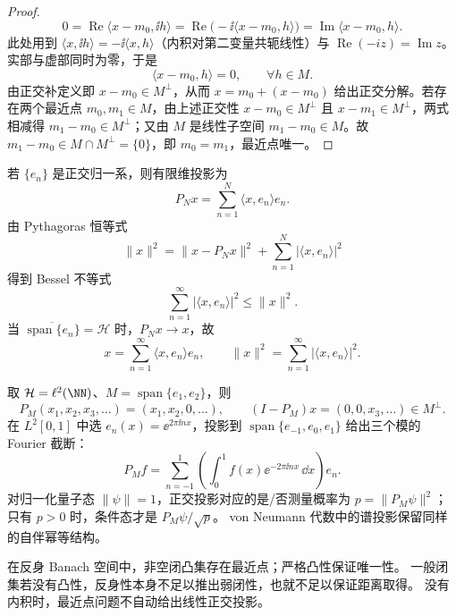 \begin{proof}
\begin{equation*}
0=\operatorname{Re}\langle x-m_0,\ii h\rangle
=\operatorname{Re}\bigl(-\ii\langle x-m_0,h\rangle\bigr)
=\operatorname{Im}\langle x-m_0,h\rangle.
\end{equation*}
此处用到 $\langle x,\ii h\rangle=-\ii\langle x,h\rangle$（内积对第二变量共轭线性）与 $\operatorname{Re}(-iz)=\operatorname{Im}z$。实部与虚部同时为零，于是
\begin{equation*}
\langle x-m_0,h\rangle=0,
\qquad \forall h\in M.
\end{equation*}
由正交补定义即 $x-m_0\in M^\perp$，从而 $x=m_0+(x-m_0)$ 给出正交分解。若存在两个最近点 $m_0,m_1\in M$，由上述正交性 $x-m_0\in M^\perp$ 且 $x-m_1\in M^\perp$，两式相减得 $m_1-m_0\in M^\perp$；又由 $M$ 是线性子空间 $m_1-m_0\in M$。故 $m_1-m_0\in M\cap M^\perp=\{0\}$，即 $m_0=m_1$，最近点唯一。
\end{proof}


\begin{proposition}
若 $\{e_n\}$ 是正交归一系，则有限维投影为
\[
P_Nx=\sum_{n=1}^N \langle x,e_n\rangle e_n.
\]
由 Pythagoras 恒等式
\[
\|x\|^2
=\|x-P_Nx\|^2+
\sum_{n=1}^N|\langle x,e_n\rangle|^2
\]
得到 Bessel 不等式
\[
\sum_{n=1}^\infty|\langle x,e_n\rangle|^2\le\|x\|^2.
\]
当 $\overline{\operatorname{span}\{e_n\}}=\mathcal H$ 时，$P_Nx\to x$，故
\[
\boxed{x=\sum_{n=1}^\infty\langle x,e_n\rangle e_n},
\qquad
\boxed{\|x\|^2=\sum_{n=1}^\infty|\langle x,e_n\rangle|^2}.
\]
\end{proposition}

\begin{example}
取 $\mathcal H=\ell^2(\NN)$、$M=\operatorname{span}\{e_1,e_2\}$，则
\[
P_M(x_1,x_2,x_3,\dots)=(x_1,x_2,0,\dots),\qquad
(I-P_M)x=(0,0,x_3,\dots)\in M^\perp.
\]
在 $L^2[0,1]$ 中选 $e_n(x)=\ee^{2\pi\ii nx}$，投影到
$\operatorname{span}\{e_{-1},e_0,e_1\}$ 给出三个模的 Fourier 截断：
\[
P_Mf=\sum_{n=-1}^1\left(\int_0^1 f(x)\ee^{-2\pi\ii nx}\,\dd x\right)e_n.
\]
对归一化量子态 $\|\psi\|=1$，正交投影对应的是/否测量概率为
$p=\|P_M\psi\|^2$；只有 $p>0$ 时，条件态才是 $P_M\psi/\sqrt p$。
von Neumann 代数中的谱投影保留同样的自伴幂等结构。
\end{example}

\begin{note}
在反身 Banach 空间中，非空闭凸集存在最近点；严格凸性保证唯一性。
一般闭集若没有凸性，反身性本身不足以推出弱闭性，也就不足以保证距离取得。
没有内积时，最近点问题不自动给出线性正交投影。
\end{note}

